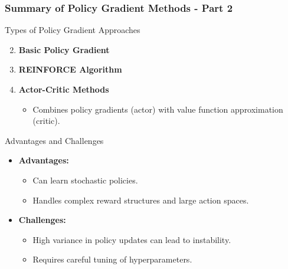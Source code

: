 \documentclass[aspectratio=169]{beamer}
\begin{document}
\begin{frame}[fragile]
    \frametitle{Summary of Policy Gradient Methods - Part 2}
    \begin{block}{Types of Policy Gradient Approaches}
        \begin{enumerate}
            \setcounter{enumi}{1}
            \item \textbf{Basic Policy Gradient}
            \item \textbf{REINFORCE Algorithm}
            \item \textbf{Actor-Critic Methods}
                \begin{itemize}
                    \item Combines policy gradients (actor) with value function approximation (critic).
                \end{itemize}
        \end{enumerate}
    \end{block}

    \begin{block}{Advantages and Challenges}
        \begin{itemize}
            \item \textbf{Advantages:}
                \begin{itemize}
                    \item Can learn stochastic policies.
                    \item Handles complex reward structures and large action spaces.
                \end{itemize}
            \item \textbf{Challenges:}
                \begin{itemize}
                    \item High variance in policy updates can lead to instability.
                    \item Requires careful tuning of hyperparameters.
                \end{itemize}
        \end{itemize}
    \end{block}
\end{frame}
\end{document}
